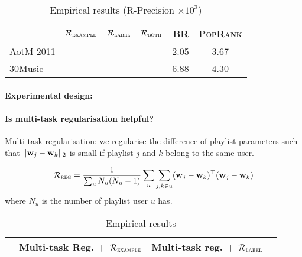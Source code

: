 \begin{table}[!h]
\centering
\caption{Empirical results (R-Precision $\times 10^3$)}
\small
\begin{tabular}{l|ccccc}
\toprule
{}            & $\mathcal{R}_\textsc{example}$ & $\mathcal{R}_\textsc{label}$ & $\mathcal{R}_\textsc{both}$ & BR & \textsc{PopRank} \\
\midrule
AotM-2011     &  &  &  & 2.05 & 3.67 \\
30Music       &  &  &  & 6.88 & 4.30 \\
\bottomrule
\end{tabular}
\end{table}

\paragraph{Experimental design:}

\paragraph{Is multi-task regularisation helpful?}

Multi-task regularisation: we regularise the difference of playlist parameters 
such that $\|\mathbf{w}_j - \mathbf{w}_k\|_2$ is small if playlist $j$ and $k$ belong to the same user.

\begin{equation*}
\mathcal{R}_\textsc{reg} = \frac{1}{\sum_u N_u (N_u - 1)} \sum_u \sum_{j, k \in u} (\mathbf{w}_j - \mathbf{w}_k)^\top (\mathbf{w}_j - \mathbf{w}_k)
\end{equation*}
where $N_u$ is the number of playlist user $u$ has.

\begin{table}[!h]
\centering
\caption{Empirical results}
\begin{tabular}{l|ccc}
\toprule
{}            & Multi-task Reg. + $\mathcal{R}_\textsc{example}$ & Multi-task reg. + $\mathcal{R}_\textsc{label}$ \\
\midrule
\bottomrule
\end{tabular}
\end{table}
